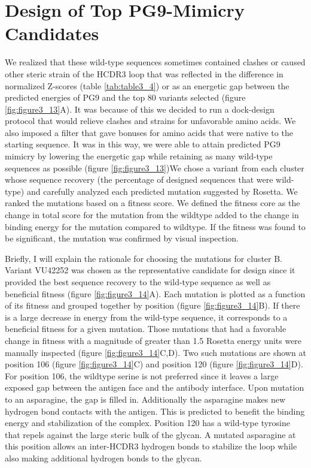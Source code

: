 \section{Design of Top PG9-Mimicry Candidates}
We realized that these wild-type sequences sometimes contained clashes or caused other steric strain of the HCDR3 loop that was reflected in the difference in normalized Z-scores (table \ref{tab:table3_4}) or as an energetic gap between the predicted energies of PG9 and the top 80 variants selected (figure \ref{fig:figure3_13}A). It was because of this we decided to run a dock-design protocol that would relieve clashes and strains for unfavorable amino acids. We also imposed a filter that gave bonuses for amino acids that were native to the starting sequence. It was in this way, we were able to attain predicted PG9 mimicry by lowering the energetic gap while retaining as many wild-type sequences as possible (figure \ref{fig:figure3_13})We chose a variant from each cluster whose sequence recovery (the percentage of designed sequences that were wild-type) and carefully analyzed each predicted mutation suggested by Rosetta. We ranked the mutations based on a fitness score. We defined the fitness core as the change in total score for the mutation from the wildtype added to the change in binding energy for the mutation compared to wildtype. If the fitness was found to be significant, the mutation was confirmed by visual inspection.

Briefly, I will explain the rationale for choosing the mutations for cluster B. Variant VU42252 was chosen as the representative candidate for design since it provided the best sequence recovery to the wild-type sequence as well as beneficial fitness (figure \ref{fig:figure3_14}A). Each mutation is plotted as a function of its fitness and grouped together by position (figure \ref{fig:figure3_14}B). If there is a large decrease in energy from the wild-type sequence, it corresponds to a beneficial fitness for a given mutation. Those mutations that had a favorable change in fitness with a magnitude of greater than 1.5 Rosetta energy units were manually inspected (figure \ref{fig:figure3_14}C,D). Two such mutations are shown at position 106 (figure \ref{fig:figure3_14}C) and position 120 (figure \ref{fig:figure3_14}D). For position 106, the wildtype serine is not preferred since it leaves a large exposed gap between the antigen face and the antibody interface. Upon mutation to an asparagine, the gap is filled in. Additionally the asparagine makes new hydrogen bond contacts with the antigen. This is predicted to benefit the binding energy and stabilization of the complex. Position 120 has a wild-type tyrosine that repels against the large steric bulk of the glycan. A mutated asparagine at this position allows an inter-HCDR3 hydrogen bonds to stabilize the loop while also making additional hydrogen bonds to the glycan.

